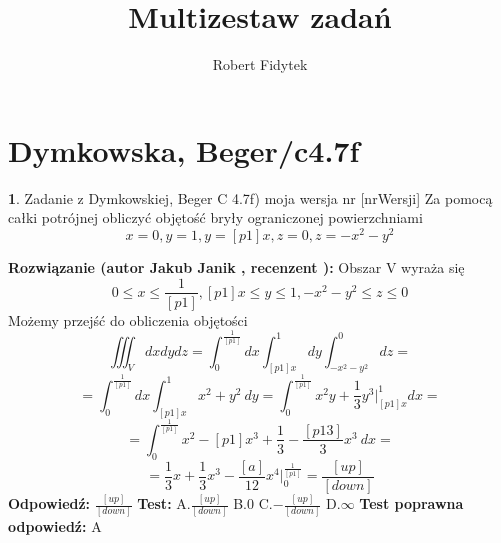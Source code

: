 \documentclass[12pt, a4paper]{article}
\title{Multizestaw zadań}
\author{Robert Fidytek}
\date{}
\theoremstyle{definition} %
\newtheorem{zad}{}
\newcommand{\kategoria}[1]{\section{#1}} %
\newcommand{\zadStart}[1]{\begin{zad}#1\newline} %
\newcommand{\zadStop}{\end{zad}}   %
\newcommand{\rozwStart}[2]{\noindent \textbf{Rozwiązanie (autor #1 , recenzent #2): }\newline} %
\newcommand{\rozwStop}{\newline}                                            %
\newcommand{\odpStart}{\noindent \textbf{Odpowiedź:}\newline}    %
\newcommand{\odpStop}{\newline}                                             %
\newcommand{\testStart}{\noindent \textbf{Test:}\newline} %
\newcommand{\testStop}{\newline} %
\newcommand{\kluczStart}{\noindent \textbf{Test poprawna odpowiedź:}\newline} %
\newcommand{\kluczStop}{\newline} %
\begin{document}
\maketitle


\kategoria{Dymkowska, Beger/c4.7f}
\zadStart{Zadanie z Dymkowskiej, Beger C 4.7f) moja wersja nr [nrWersji]}
Za pomocą całki potrójnej obliczyć objętość bryły ograniczonej powierzchniami
$$x=0, y=1, y=[p1]x, z=0, z=-x^2-y^2$$
\zadStop
\rozwStart{Jakub Janik}{}
Obszar V wyraża się $$0 \leq x \leq \frac{1}{[p1]}, [p1]x \leq y \leq 1, -x^2-y^2 \leq z \leq 0$$
Możemy przejść do obliczenia objętości
$$\iiint_V dxdydz=\int_0^{\frac{1}{[p1]}}dx\int_{[p1]x}^1dy\int_{-x^2-y^2}^0dz=$$
$$=\int_0^{\frac{1}{[p1]}}dx\int_{[p1]x}^1x^2+y^2\ dy=\int_0^{\frac{1}{[p1]}}x^2y+\frac{1}{3}y^3\Big|_{[p1]x}^1dx=$$
$$=\int_0^{\frac{1}{[p1]}}x^2-[p1]x^3+\frac{1}{3}-\frac{[p13]}{3}x^3\ dx=$$
$$=\frac{1}{3}x+\frac{1}{3}x^3-\frac{[a]}{12}x^4\Big|_0^{\frac{1}{[p1]}}=\frac{[up]}{[down]}$$
\rozwStop
\odpStart
$\frac{[up]}{[down]}$
\odpStop
\testStart
A.$\frac{[up]}{[down]}$
B.$0$
C.$-\frac{[up]}{[down]}$
D.$\infty$
\testStop
\kluczStart
A
\kluczStop
\end{document}
